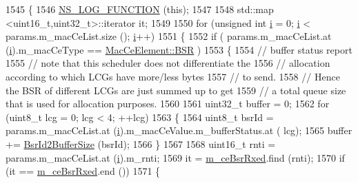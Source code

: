 \begin{DoxyCode}
1545 \{
1546         \hyperlink{log-macros-disabled_8h_a90b90d5bad1f39cb1b64923ea94c0761}{NS\_LOG\_FUNCTION} (\textcolor{keyword}{this});
1547 
1548         std::map <uint16\_t,uint32\_t>::iterator it;
1549 
1550         \textcolor{keywordflow}{for} (\textcolor{keywordtype}{unsigned} \textcolor{keywordtype}{int} \hyperlink{bernuolliDistribution_8m_a6f6ccfcf58b31cb6412107d9d5281426}{i} = 0; \hyperlink{bernuolliDistribution_8m_a6f6ccfcf58b31cb6412107d9d5281426}{i} < params.m\_macCeList.size (); \hyperlink{bernuolliDistribution_8m_a6f6ccfcf58b31cb6412107d9d5281426}{i}++)
1551         \{
1552                 \textcolor{keywordflow}{if} ( params.m\_macCeList.at (\hyperlink{bernuolliDistribution_8m_a6f6ccfcf58b31cb6412107d9d5281426}{i}).m\_macCeType == \hyperlink{structns3_1_1MacCeElement_a7b68183e7a7fd9b02783f92a2c645d7ba459101d6c51f15c22bfdf75d68f9c631}{MacCeElement::BSR} )
1553                 \{
1554                         \textcolor{comment}{// buffer status report}
1555                         \textcolor{comment}{// note that this scheduler does not differentiate the}
1556                         \textcolor{comment}{// allocation according to which LCGs have more/less bytes}
1557                         \textcolor{comment}{// to send.}
1558                         \textcolor{comment}{// Hence the BSR of different LCGs are just summed up to get}
1559                         \textcolor{comment}{// a total queue size that is used for allocation purposes.}
1560 
1561                         uint32\_t buffer = 0;
1562                         \textcolor{keywordflow}{for} (uint8\_t lcg = 0; lcg < 4; ++lcg)
1563                         \{
1564                                 uint8\_t bsrId = params.m\_macCeList.at (\hyperlink{bernuolliDistribution_8m_a6f6ccfcf58b31cb6412107d9d5281426}{i}).m\_macCeValue.m\_bufferStatus.at (
      lcg);
1565                                 buffer += \hyperlink{classns3_1_1MmWaveFlexTtiMacScheduler_a2de0d6da8a161c34721136d1dff22038}{BsrId2BufferSize} (bsrId);
1566                         \}
1567 
1568                         uint16\_t rnti = params.m\_macCeList.at (\hyperlink{bernuolliDistribution_8m_a6f6ccfcf58b31cb6412107d9d5281426}{i}).m\_rnti;
1569                         it = \hyperlink{classns3_1_1MmWaveFlexTtiMacScheduler_a3f24f21e6b97c5f90be970f6f8b3bffa}{m\_ceBsrRxed}.find (rnti);
1570                         \textcolor{keywordflow}{if} (it == \hyperlink{classns3_1_1MmWaveFlexTtiMacScheduler_a3f24f21e6b97c5f90be970f6f8b3bffa}{m\_ceBsrRxed}.end ())
1571                         \{

\end{DoxyCode}
